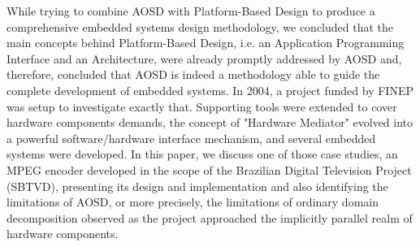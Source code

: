 While trying to combine AOSD with Platform-Based Design to produce a comprehensive embedded systems design methodology, we concluded that the main concepts behind Platform-Based Design, i.e. an Application Programming Interface and an Architecture, were already promptly addressed by AOSD and, therefore, concluded that AOSD is indeed a methodology able to guide the complete development of embedded systems. In 2004, a project funded by FINEP was setup to investigate exactly that. Supporting tools were extended to cover hardware components demands, the concept of "Hardware Mediator" evolved into a powerful software/hardware interface mechanism, and several embedded systems were developed. In this paper, we discuss one of those case studies, an MPEG encoder developed in the scope of the Brazilian Digital Television Project (SBTVD), presenting its design and implementation and also identifying the limitations of AOSD, or more precisely, the limitations of ordinary domain decomposition observed as the project approached the implicitly parallel realm of hardware components.


